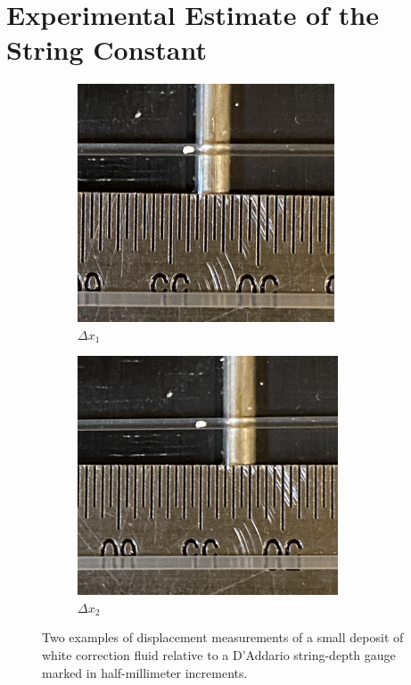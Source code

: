 %
%
%

 \section{Experimental Estimate of the String Constant\label{sct:exp}}

 \begin{figure}
  \centering
  \begin{subfigure}[b]{0.45\textwidth}
      \centering
      \includegraphics[width=3.0in]{../figures/exp_dx1.jpg}
      \caption{$\Delta x_1$}
      \label{fig:exp_dx1}
  \end{subfigure}
  \hspace{0.25in}
  \begin{subfigure}[b]{0.45\textwidth}
      \centering
      \includegraphics[width=3.04in]{../figures/exp_dx2.jpg}
      \caption{$\Delta x_2$}
      \label{fig:exp_dx2}
  \end{subfigure}
  \caption{\label{fig:exp_dx} Two examples of displacement measurements of a small deposit of white correction fluid relative to a D'Addario string-depth gauge marked in half-millimeter increments.}
\end{figure}

